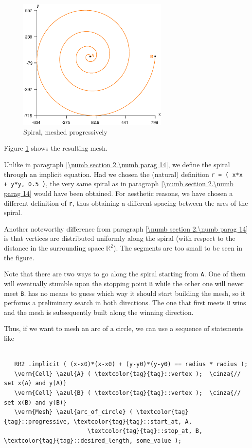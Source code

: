\begin{figure} \centering
 \includegraphics[width=75mm]{spiral-prog}
  \caption{Spiral, meshed progressively}
 \label{\numb section 3.\numb fig 3}
\end{figure}

Figure \ref{\numb section 3.\numb fig 3} shows the resulting mesh.

Unlike in paragraph \ref{\numb section 2.\numb parag 14}, we define the spiral through
an implicit equation.
Had we chosen the (natural) definition {\small\tt r =  ( x*x + y*y, 0.5 )},
the very same spiral as in paragraph \ref{\numb section 2.\numb parag 14} would have been
obtained.
For aesthetic reasons, we have chosen a different definition of {\small\tt r}, thus obtaining
a different spacing between the arcs of the spiral.

Another noteworthy difference from paragraph \ref{\numb section 2.\numb parag 14} is that
vertices are distributed uniformly along the spiral (with respect to the distance
in the surrounding space $ \mathbb{R}^2 $).
The segments are too small to be seen in the figure.

Note that there are two ways to go along the spiral starting from {\small\tt A}.
One of them will eventually stumble upon the stopping point {\small\tt B} while
the other one will never meet {\small\tt B}.
{\ManiFEM} has no means to guess which way it should start building the mesh,
so it performs a preliminary search in both directions.
The one that first meets {\small\tt B} wins and the mesh is subsequently built along
the winning direction.

Thus, if we want to mesh an arc of a circle, we can use a sequence of statements like

\begin{Verbatim}[commandchars=\\\{\},formatcom=\small\tt,
   baselinestretch=0.94,framesep=2mm                      ]

   RR2 .implicit ( (x-x0)*(x-x0) + (y-y0)*(y-y0) == radius * radius );
   \verm{Cell} \azul{A} ( \textcolor{tag}{tag}::vertex );  \cinza{// set x(A) and y(A)}
   \verm{Cell} \azul{B} ( \textcolor{tag}{tag}::vertex );  \cinza{// set x(B) and y(B)}
   \verm{Mesh} \azul{arc_of_circle} ( \textcolor{tag}{tag}::progressive, \textcolor{tag}{tag}::start_at, A,
                        \textcolor{tag}{tag}::stop_at, B, \textcolor{tag}{tag}::desired_length, some_value );
\end{Verbatim}


